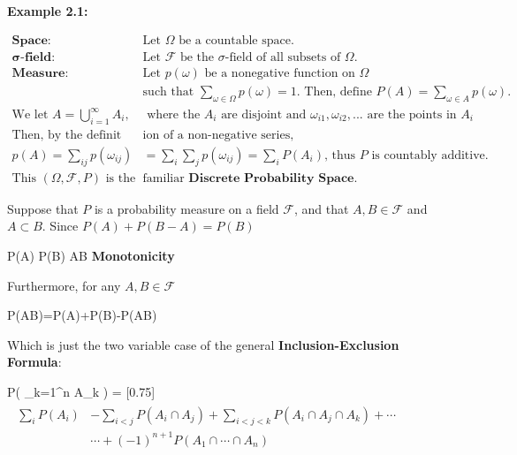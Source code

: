                 \textbf{Example 2.1:} 
                \begin{proofline}
                \[
                    \begin{aligned}
                    \textbf{Space: } & \text{Let } \Omega \text{ be a countable space.}\\
                    \boldsymbol{\sigma}\textbf{-field: } & \text{Let } \mathcal{F} \text{ be the $\sigma$-field of all subsets of } \Omega.\\
                    \textbf{Measure: } & \text{Let }  p(\omega) \text{ be a nonegative function on } \Omega \\
                                       & \text{such that } \sum_{\omega\in\Omega}p(\omega)=1. \text{ Then, define } P(A)= \sum_{\omega\in A}p(\omega).\\
                    \text{We let } {\textstyle A=\bigcup_{i=1}^{\infty}A_i},& \text{ where the } A_i \text{ are disjoint and } \omega_{i1}, \omega_{i2},... \text{ are the points in } A_i\\
                    \text{Then, by the definit} & \text{ion of a non-negative series, }\\
                    p(A)=\sum_{ij}p(\omega_{ij})&=\sum_i\sum_j p(\omega_{ij})= \sum_i P(A_i) \text{, thus } P \text{ is countably additive.}\\
                    \text{This } (\Omega, \mathcal{F}, P) \text{ is the }& \text{familiar } \textbf{Discrete Probability Space.}
                \end{aligned}
                \]
                \end{proofline}
                
	      		Suppose that $P$ is a probability measure on a field $\mathcal{F}$, and that $A,B \in \mathcal{F}$ and $A \subset B$. Since $P(A)+P(B-A)=P(B)$
	      		\begin{UNequation}
	      			P(A) \leq P(B) \quad  \quad  {} A\subset B \quad \quad \textbf{\scriptsize Monotonicity}
	      		\end{UNequation}
	      		Furthermore, for any $A,B \in \mathcal{F}$
	      		\begin{UNequation}
	      			P(A\cup B)=P(A)+P(B)-P(A\cap B)
	      		\end{UNequation}
	      		Which is just the two variable case of the general \textbf{Inclusion-Exclusion Formula}:
	      		\begin{UNequation}
	      			P\left( \bigcup_{k=1}^{n} A_k \right)
	      			= \scalebox{0.75}[0.75]{$
	      				\substack{
	      					\begin{aligned}
	      						\sum_i P(A_i) & - \sum_{i<j} P(A_i \cap A_j) + \sum_{i<j<k} P(A_i \cap A_j \cap A_k)+\cdots \\
	      						              & \cdots + (-1)^{n+1} P(A_1 \cap \cdots \cap A_n)                             
	      					\end{aligned}}$}
	      		\end{UNequation}
	      		

